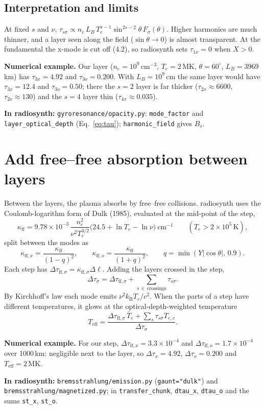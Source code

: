 \documentclass[11pt,a4paper]{article}
\newcommand{\kB}{k_\mathrm{B}}
\newcommand{\code}[1]{\texttt{#1}}
\newcommand{\example}[1]{\par\noindent\colorbox{boxbg}{\parbox{\dimexpr\linewidth-2\fboxsep}{\small\textbf{Numerical example.} #1}}\par}
\newcommand{\incode}[1]{\par{\small\color{head!80!black}\textbf{In radiosynth:} #1}\par}
\begin{document}
\subsection{Interpretation and limits}
At fixed $s$ and $\nu$, $\tau_{s\sigma}\propto n_e\,L_B\,T_e^{s-1}\sin^{2s-2}\theta\,F_\sigma(\theta)$. Higher harmonics
are much thinner, and a layer seen along the field ($\sin\theta\to0$) is almost transparent. At the
fundamental the x-mode is cut off (4.2), so radiosynth sets $\tau_{1x}=0$ when $X>0$.
\example{Our layer ($n_e=10^9$\,cm$^{-3}$, $T_e=2$\,MK, $\theta=60^\circ$, $L_B=3969$\,km) has
$\tau_{3x}=4.92$ and $\tau_{3o}=0.200$. With $L_B=10^9$\,cm the same layer would have
$\tau_{3x}=12.4$ and $\tau_{3o}=0.50$; there the $s=2$ layer is far thicker
($\tau_{2x}\approx6600$, $\tau_{2o}\approx130$) and the $s=4$ layer thin ($\tau_{4x}\approx0.035$).}
\incode{\code{gyroresonance/opacity.py}: \code{mode\_factor} and \code{layer\_optical\_depth}
(Eq.~\ref{eq:tau}); \code{harmonic\_field} gives $B_s$.}

\section{Add free--free absorption between layers}
Between the layers, the plasma absorbs by free--free collisions. radiosynth uses the
Coulomb-logarithm form of Dulk (1985), evaluated at the mid-point of the step,
\begin{equation}
  \kappa_\text{ff}=9.78\times10^{-3}\,\frac{n_e^2}{\nu^2T_e^{3/2}}\big(24.5+\ln T_e-\ln\nu\big)\ \text{cm}^{-1}
  \qquad(T_e>2\times10^5\,\text{K}),
\end{equation}
split between the modes as
\begin{equation}
  \kappa_{\text{ff},x}=\frac{\kappa_\text{ff}}{(1-q)^2},\qquad
  \kappa_{\text{ff},o}=\frac{\kappa_\text{ff}}{(1+q)^2},\qquad q=\min(Y|\cos\theta|,\,0.9).
\end{equation}
Each step has $\Delta\tau_{\text{ff},\sigma}=\kappa_{\text{ff},\sigma}\Delta\ell$. Adding the layers crossed in the step,
\begin{equation}
  \Delta\tau_\sigma=\Delta\tau_{\text{ff},\sigma}+\sum_{s\,\in\,\text{crossings}}\tau_{s\sigma}.
\end{equation}
By Kirchhoff's law each mode emits $\nu^2\kB T_e/c^2$. When the parts of a step have different
temperatures, it glows at the optical-depth-weighted temperature
\begin{equation}
  T_\text{eff}=\frac{\Delta\tau_{\text{ff},\sigma}\,\bar T_e+\sum_s\tau_{s\sigma}T_{e,c}}{\Delta\tau_\sigma}.
\end{equation}
\example{For our step, $\Delta\tau_{\text{ff},x}=3.3\times10^{-4}$ and $\Delta\tau_{\text{ff},o}=1.7\times10^{-4}$ over
1000\,km: negligible next to the layer, so $\Delta\tau_x=4.92$, $\Delta\tau_o=0.200$ and $T_\text{eff}=2$\,MK.}
\incode{\code{bremsstrahlung/emission.py} (\code{gaunt="dulk"}) and
\code{bremsstrahlung/magnetized.py}; in \code{transfer\_chunk}, \code{dtau\_x}, \code{dtau\_o} and the sums
\code{st\_x}, \code{st\_o}.}
\end{document}
